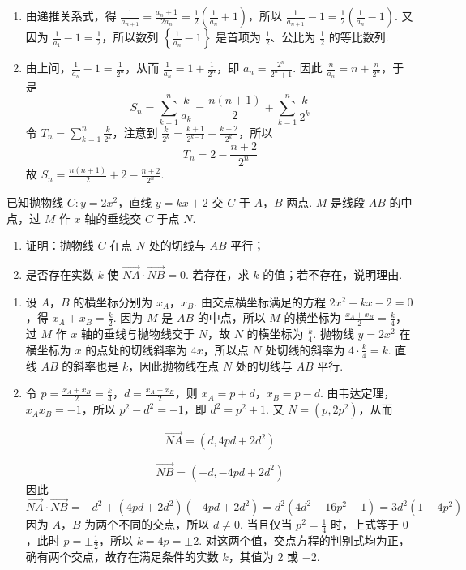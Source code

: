 \begin{solution}
\begin{enumerate}
\item 由递推关系式，得 \(\frac{1}{a_{n+1}}=\frac{a_n+1}{2a_n}=\frac{1}{2}\left(\frac{1}{a_n}+1\right)\)，所以 \(\frac{1}{a_{n+1}}-1=\frac{1}{2}\left(\frac{1}{a_n}-1\right)\). 又因为 \(\frac{1}{a_1}-1=\frac{1}{2}\)，所以数列 \(\left\{\frac{1}{a_n}-1\right\}\) 是首项为 \(\frac{1}{2}\)、公比为 \(\frac{1}{2}\) 的等比数列.
\item 由上问，\(\frac{1}{a_n}-1=\frac{1}{2^n}\)，从而 \(\frac{1}{a_n}=1+\frac{1}{2^n}\)，即 \(a_n=\frac{2^n}{2^n+1}\). 因此 \(\frac{n}{a_n}=n+\frac{n}{2^n}\)，于是
\[
S_n=\sum_{k=1}^{n}\frac{k}{a_k}=\frac{n(n+1)}{2}+\sum_{k=1}^{n}\frac{k}{2^k}
\]
令 \(T_n=\sum_{k=1}^{n}\frac{k}{2^k}\)，注意到 \(\frac{k}{2^k}=\frac{k+1}{2^{k-1}}-\frac{k+2}{2^k}\)，所以
\[
T_n=2-\frac{n+2}{2^n}
\]
故 \(S_n=\frac{n(n+1)}{2}+2-\frac{n+2}{2^n}\).
\end{enumerate}
\end{solution}

\begin{problem}
已知抛物线 \(C: y = 2x^{2}\)，直线 \(y = kx + 2\) 交 \(C\) 于 \(A\)，\(B\) 两点. \(M\) 是线段 \(AB\) 的中点，过 \(M\) 作 \(x\) 轴的垂线交 \(C\) 于点 \(N\). 
\begin{enumerate}
\item 证明：抛物线 \(C\) 在点 \(N\) 处的切线与 \(AB\) 平行；
\item 是否存在实数 \(k\) 使 \(\overrightarrow{NA} \cdot \overrightarrow{NB} = 0\). 若存在，求 \(k\) 的值；若不存在，说明理由.
\end{enumerate}
\end{problem}

\begin{solution}
\begin{enumerate}
\item 设 \(A\)，\(B\) 的横坐标分别为 \(x_A\)，\(x_B\). 由交点横坐标满足的方程 \(2x^2-kx-2=0\)，得 \(x_A+x_B=\frac{k}{2}\). 因为 \(M\) 是 \(AB\) 的中点，所以 \(M\) 的横坐标为 \(\frac{x_A+x_B}{2}=\frac{k}{4}\)，过 \(M\) 作 \(x\) 轴的垂线与抛物线交于 \(N\)，故 \(N\) 的横坐标为 \(\frac{k}{4}\). 抛物线 \(y=2x^2\) 在横坐标为 \(x\) 的点处的切线斜率为 \(4x\)，所以点 \(N\) 处切线的斜率为 \(4\cdot\frac{k}{4}=k\). 直线 \(AB\) 的斜率也是 \(k\)，因此抛物线在点 \(N\) 处的切线与 \(AB\) 平行.
\item 令 \(p=\frac{x_A+x_B}{2}=\frac{k}{4}\)，\(d=\frac{x_A-x_B}{2}\)，则 \(x_A=p+d\)，\(x_B=p-d\). 由韦达定理，\(x_Ax_B=-1\)，所以 \(p^2-d^2=-1\)，即 \(d^2=p^2+1\). 又 \(N=(p,2p^2)\)，从而

\[
\overrightarrow{NA}=\left(d,4pd+2d^2\right)
\]

\[
\overrightarrow{NB}=\left(-d,-4pd+2d^2\right)
\]
因此
\[
\overrightarrow{NA}\cdot\overrightarrow{NB}=-d^2+\left(4pd+2d^2\right)\left(-4pd+2d^2\right)=d^2\left(4d^2-16p^2-1\right)=3d^2\left(1-4p^2\right)
\]
因为 \(A\)，\(B\) 为两个不同的交点，所以 \(d\neq0\). 当且仅当 \(p^2=\frac{1}{4}\) 时，上式等于 \(0\)，此时 \(p=\pm\frac{1}{2}\)，所以 \(k=4p=\pm2\). 对这两个值，交点方程的判别式均为正，确有两个交点，故存在满足条件的实数 \(k\)，其值为 \(2\) 或 \(-2\).
\end{enumerate}
\end{solution}

